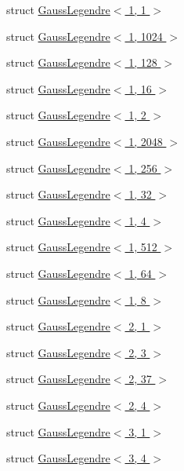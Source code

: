 \begin{DoxyCompactItemize}
struct \hyperlink{structmodel_1_1_gauss_legendre_3_011_00_011_01_4}{Gauss\+Legendre$<$ 1, 1 $>$}
\item 
struct \hyperlink{structmodel_1_1_gauss_legendre_3_011_00_011024_01_4}{Gauss\+Legendre$<$ 1, 1024 $>$}
\item 
struct \hyperlink{structmodel_1_1_gauss_legendre_3_011_00_01128_01_4}{Gauss\+Legendre$<$ 1, 128 $>$}
\item 
struct \hyperlink{structmodel_1_1_gauss_legendre_3_011_00_0116_01_4}{Gauss\+Legendre$<$ 1, 16 $>$}
\item 
struct \hyperlink{structmodel_1_1_gauss_legendre_3_011_00_012_01_4}{Gauss\+Legendre$<$ 1, 2 $>$}
\item 
struct \hyperlink{structmodel_1_1_gauss_legendre_3_011_00_012048_01_4}{Gauss\+Legendre$<$ 1, 2048 $>$}
\item 
struct \hyperlink{structmodel_1_1_gauss_legendre_3_011_00_01256_01_4}{Gauss\+Legendre$<$ 1, 256 $>$}
\item 
struct \hyperlink{structmodel_1_1_gauss_legendre_3_011_00_0132_01_4}{Gauss\+Legendre$<$ 1, 32 $>$}
\item 
struct \hyperlink{structmodel_1_1_gauss_legendre_3_011_00_014_01_4}{Gauss\+Legendre$<$ 1, 4 $>$}
\item 
struct \hyperlink{structmodel_1_1_gauss_legendre_3_011_00_01512_01_4}{Gauss\+Legendre$<$ 1, 512 $>$}
\item 
struct \hyperlink{structmodel_1_1_gauss_legendre_3_011_00_0164_01_4}{Gauss\+Legendre$<$ 1, 64 $>$}
\item 
struct \hyperlink{structmodel_1_1_gauss_legendre_3_011_00_018_01_4}{Gauss\+Legendre$<$ 1, 8 $>$}
\item 
struct \hyperlink{structmodel_1_1_gauss_legendre_3_012_00_011_01_4}{Gauss\+Legendre$<$ 2, 1 $>$}
\item 
struct \hyperlink{structmodel_1_1_gauss_legendre_3_012_00_013_01_4}{Gauss\+Legendre$<$ 2, 3 $>$}
\item 
struct \hyperlink{structmodel_1_1_gauss_legendre_3_012_00_0137_01_4}{Gauss\+Legendre$<$ 2, 37 $>$}
\item 
struct \hyperlink{structmodel_1_1_gauss_legendre_3_012_00_014_01_4}{Gauss\+Legendre$<$ 2, 4 $>$}
\item 
struct \hyperlink{structmodel_1_1_gauss_legendre_3_013_00_011_01_4}{Gauss\+Legendre$<$ 3, 1 $>$}
\item 
struct \hyperlink{structmodel_1_1_gauss_legendre_3_013_00_014_01_4}{Gauss\+Legendre$<$ 3, 4 $>$}
\item 

\end{DoxyCompactItemize}
